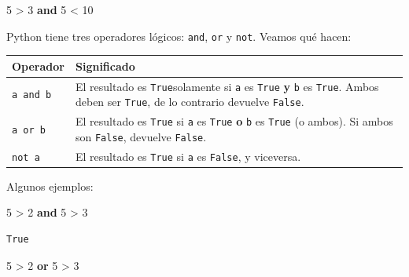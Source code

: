 \documentclass[
  letterpaper,
  DIV=11,
  numbers=noendperiod]{scrreprt}
\newenvironment{Shaded}{\begin{snugshade}}{\end{snugshade}}
\newcommand{\DecValTok}[1]{\textcolor[rgb]{0.68,0.00,0.00}{#1}}
\newcommand{\KeywordTok}[1]{\textcolor[rgb]{0.00,0.23,0.31}{\textbf{#1}}}
\newcommand{\OperatorTok}[1]{\textcolor[rgb]{0.37,0.37,0.37}{#1}}
\begin{document}
\begin{Shaded}
\begin{Highlighting}[]
\DecValTok{5} \OperatorTok{\textgreater{}} \DecValTok{3} \KeywordTok{and} \DecValTok{5} \OperatorTok{\textless{}} \DecValTok{10}
\end{Highlighting}
\end{Shaded}

Python tiene tres operadores lógicos: \texttt{and}, \texttt{or} y
\texttt{not}. Veamos qué hacen:

\begin{longtable}[]{@{}
  >{\raggedright\arraybackslash}p{}
  >{\raggedright\arraybackslash}p{}@{}}
\toprule\noalign{}
\begin{minipage}[b]{\linewidth}\raggedright
Operador
\end{minipage} & \begin{minipage}[b]{\linewidth}\raggedright
Significado
\end{minipage} \\
\midrule\noalign{}
\endhead
\bottomrule\noalign{}
\endlastfoot
\texttt{a\ and\ b} & El resultado es \texttt{True}solamente si
\texttt{a} es \texttt{True} \textbf{y} \texttt{b} es \texttt{True}.
Ambos deben ser \texttt{True}, de lo contrario devuelve
\texttt{False}. \\
\texttt{a\ or\ b} & El resultado es \texttt{True} si \texttt{a} es
\texttt{True} \textbf{o} \texttt{b} es \texttt{True} (o ambos). Si ambos
son \texttt{False}, devuelve \texttt{False}. \\
\texttt{not\ a} & El resultado es \texttt{True} si \texttt{a} es
\texttt{False}, y viceversa. \\
\end{longtable}

Algunos ejemplos:

\begin{Shaded}
\begin{Highlighting}[]
\DecValTok{5} \OperatorTok{\textgreater{}} \DecValTok{2} \KeywordTok{and} \DecValTok{5} \OperatorTok{\textgreater{}} \DecValTok{3}
\end{Highlighting}
\end{Shaded}

\begin{verbatim}
True
\end{verbatim}

\begin{Shaded}
\begin{Highlighting}[]
\DecValTok{5} \OperatorTok{\textgreater{}} \DecValTok{2} \KeywordTok{or} \DecValTok{5} \OperatorTok{\textgreater{}} \DecValTok{3}
\end{Highlighting}
\end{Shaded}
\end{document}
